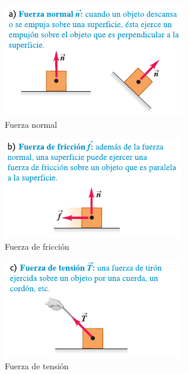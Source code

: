 \documentclass{article}
\begin{document}
        \begin{multicols}{3}
            \centering
            \begin{figure}[H]
                \centering
                \includegraphics[scale=0.6]{img/2.1-1.png}
                \caption{Fuerza normal}
                \label{fig:Fuerza normal}
            \end{figure}

            \columnbreak

            \begin{figure}[H]
                \centering
                \includegraphics[scale=0.6]{img/2.1-2.png}
                \caption{Fuerza de fricción}
                \label{fig:Fuerza de fricción}
            \end{figure}

            \columnbreak

            \begin{figure}[H]
                \centering
                \includegraphics[scale=0.6]{img/2.1-3.png}
                \caption{Fuerza de tensión}
                \label{fig:Fuerza de tension}
            \end{figure}

        \end{multicols}
\end{document}
